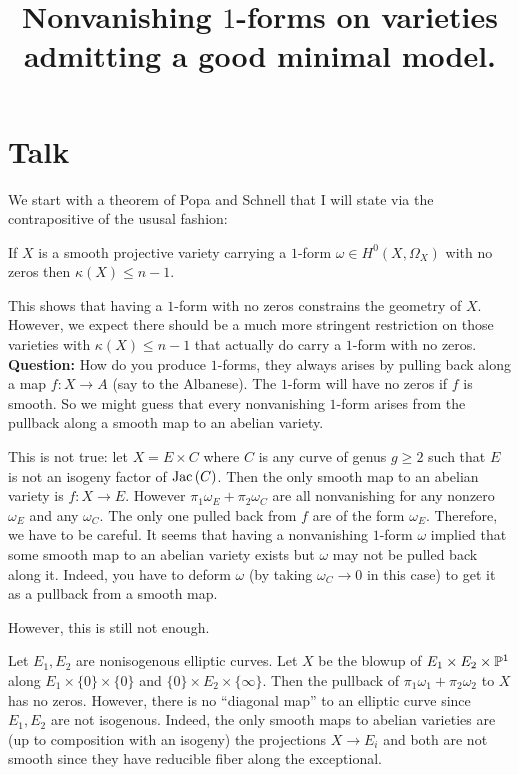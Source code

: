 \documentclass[12pt]{article}
\begin{document}
\title{Nonvanishing $1$-forms on varieties admitting a good minimal model.}

\maketitle

\section{Talk}

We start with a theorem of Popa and Schnell that I will state via the contrapositive of the ususal fashion:

\begin{theorem}
If $X$ is a smooth projective variety carrying a $1$-form $\omega \in H^0(X, \Omega_X)$ with no zeros then $\kappa(X) \le n-1$. 
\end{theorem}

This shows that having a $1$-form with no zeros constrains the geometry of $X$. However, we expect there should be a much more stringent restriction on those varieties with $\kappa(X) \le n-1$ that actually do carry a $1$-form with no zeros. 
\bigskip\\
\textbf{Question:}
How do you produce $1$-forms, they always arises by pulling back along a map $f : X \to A$ (say to the Albanese). The $1$-form will have no zeros if $f$ is smooth. So we might guess that every nonvanishing $1$-form arises from the pullback along a smooth map to an abelian variety.

\begin{example}
This is not true: let $X = E \times C$ where $C$ is any curve of genus $g \ge 2$ such that $E$ is not an isogeny factor of $\Jac{C}$. Then the only smooth map to an abelian variety is $f : X \to E$. However $\pi_1 \omega_E + \pi_2 \omega_C$ are all nonvanishing for any nonzero $\omega_E$ and any $\omega_C$. The only one pulled back from $f$ are of the form $\omega_E$. Therefore, we have to be careful. It seems that having a nonvanishing $1$-form $\omega$ implied that some smooth map to an abelian variety exists but $\omega$ may not be pulled back along it. Indeed, you have to deform $\omega$ (by taking $\omega_C \to 0$ in this case) to get it as a pullback from a smooth map.
\end{example}

However, this is still not enough.

\begin{example}
Let $E_1, E_2$ are nonisogenous elliptic curves. Let $X$ be the blowup of $E_1 \times E_2 \times \P^1$ along $E_1 \times \{ 0 \} \times \{ 0 \}$ and $\{ 0 \} \times E_2 \times \{ \infty \}$. Then the pullback of $\pi_1 \omega_1 + \pi_2 \omega_2$ to $X$ has no zeros. However, there is no ``diagonal map'' to an elliptic curve since $E_1, E_2$ are not isogenous. Indeed, the only smooth maps to abelian varieties are (up to composition with an isogeny) the projections $X \to E_i$ and both are not smooth since they have reducible fiber along the exceptional. 
\end{example}
\end{document}
